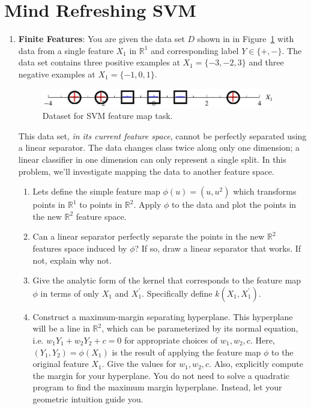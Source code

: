 \section{Mind Refreshing SVM }

\begin{enumerate}
\item \textbf{Finite Features}: You are given the data set $D$ shown
  in in Figure~\ref{fig:svm_dataset} with data from a single feature
  $X_1$ in $\mathbb{R}^1$ and corresponding label $Y\in\{+,-\}$. The
  data set contains three positive examples at $X_1=\{-3,-2,3\}$ and
  three negative examples at $X_1=\{-1,0,1\}$.

  \begin{figure}[h]
    \begin{center}
      \includegraphics[width=4in]{images/svm_dataset.jpeg}
    \end{center}
    \caption{Dataset for SVM feature map task.}
    \label{fig:svm_dataset}
  \end{figure}
  
  This data set, \emph{in its current feature space}, cannot be
  perfectly separated using a linear separator.  The data changes
  class twice along only one dimension; a linear classifier in one
  dimension can only represent a single split.  In this problem, we'll
  investigate mapping the data to another feature space.

  \begin{enumerate}
  \item {} Lets define the simple feature map
    $\phi(u)=(u,u^2)$ which transforms points in $\mathbb{R}^1$ to
    points in $\mathbb{R}^2$.  Apply $\phi$ to the data and plot the
    points in the new $\mathbb{R}^2$ feature space.
  
  \item {} Can a linear separator perfectly separate the
    points in the new $\mathbb{R}^2$ features space induced by $\phi$?
    If so, draw a linear separator that works.  If not, explain why
    not.

   
  \item {} Give the analytic form of the kernel that
    corresponds to the feature map $\phi$ in terms of only $X_1$ and
    $X_1^{\prime}$.  Specifically define $k(X_1,X_1^{\prime})$.
  
  \item {} Construct a maximum-margin separating hyperplane.
    This hyperplane will be a line in $\mathbb{R}^2$, which can be
    parameterized by its normal equation, i.e. $w_1 Y_1 + w_2 Y_2 + c
    = 0$ for appropriate choices of $w_1,w_2,c$.  Here, $(Y_1,Y_2) =
    \phi(X_1)$ is the result of applying the feature map $\phi$ to the
    original feature $X_1$. Give the values for $w_1, w_2, c$.  Also,
    explicitly compute the margin for your hyperplane.  You do not
    need to solve a quadratic program to find the maximum margin
    hyperplane.  Instead, let your geometric intuition guide you.
  

\end{enumerate}
\end{enumerate}
